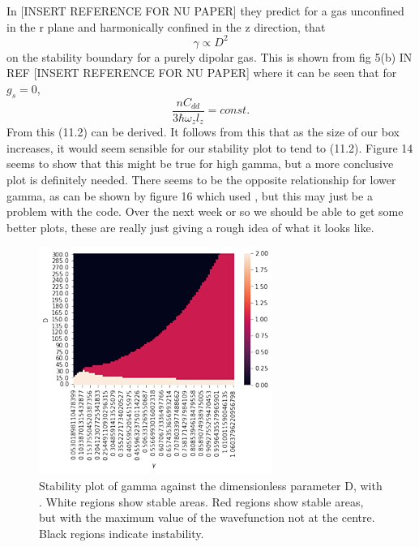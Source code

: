 \documentclass[10pt]{article}
\numberwithin{equation}{section}
\begin{document}
\begin{multicols}{2}
In [INSERT REFERENCE FOR NU PAPER] they predict for a gas unconfined in the r plane and harmonically confined in the z direction, that
\begin{equation}
\gamma\propto D^{2}
\end{equation} 
on the stability boundary for a purely dipolar gas. This is shown from fig 5(b) IN REF [INSERT REFERENCE FOR NU PAPER] where it can be seen that for $g_{s} =0$,
\begin{equation}
 \frac{nC_{dd}}{3\hbar\omega_{z}l_{z}}=const.
\end{equation}
From this (11.2) can be derived. It follows from this that as the size of our box increases, it would seem sensible for our stability plot to tend to (11.2). Figure 14 seems to show that this might be true for high gamma, but a more conclusive plot is definitely needed. There seems to be the opposite relationship for lower gamma, as can be shown by figure 16 which used , but this may just be a problem with the code. Over the next week or so we should be able to get some better plots, these are really just giving a rough idea of what it looks like.

\begin{figure}[H]
\centering
\includegraphics[width=\linewidth]{stablebox1}
\caption{Stability plot of gamma against the dimensionless parameter D, with . White regions show stable areas. Red regions show stable areas, but with the maximum value of the wavefunction not at the centre. Black regions indicate instability.}
\end{figure}


\end{multicols}
\end{document}
